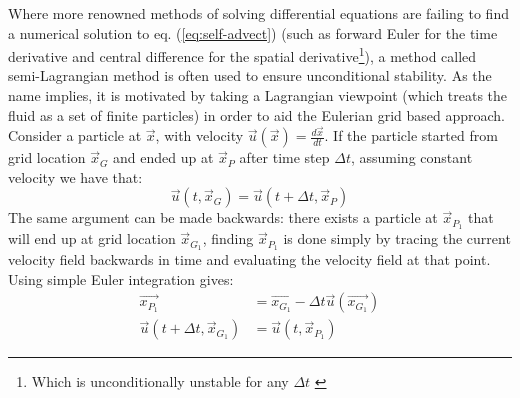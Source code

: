 \label{sec:self-advection-implementation}
Where more renowned methods of solving differential equations are failing to find a numerical solution to eq. (\ref{eq:self-advect}) (such as forward Euler for the time derivative and central difference for the spatial derivative\footnote{Which is unconditionally unstable for any \begin{math}\Delta t\end{math} \cite[p.~28]{bridson}}), a method called semi-Lagrangian method is often used to ensure unconditional stability. As the name implies, it is motivated by taking a Lagrangian viewpoint (which treats the fluid as a set of finite particles) in order to aid the Eulerian grid based approach. Consider a particle at  \begin{math}\vec{x}\end{math}, with velocity \begin{math}\vec{u}(\vec{x}) = \frac{d\vec{x}}{dt}\end{math}. If the particle started from grid location \begin{math}\vec{x}_G\end{math} and ended up at \begin{math}\vec{x}_P\end{math} after time step \begin{math}\Delta t \end{math}, assuming constant velocity we have that: 
\begin{equation}
\vec{u}(t,\vec{x}_G) = \vec{u}(t+\Delta t,\vec{x}_P)  
\end{equation}
The same argument can be made backwards: there exists a particle at \begin{math}\vec{x}_{P_1} \end{math} that will end up at grid location \begin{math}\vec{x}_{G_1}\end{math}, finding \begin{math}\vec{x}_{P_1}\end{math} is done simply by tracing the current velocity field backwards in time and evaluating the velocity field at that point. Using simple Euler integration gives: 
	\begin{align}
					      \label{eq:lagrangian}\vec{x_{P_1}}  & =    \vec{x_{G_1}} -  \Delta t \vec{u}(\vec{x_{G_1}})  \\ 
		\vec{u}(t + \Delta t,\vec{x}_{G_1}) &  =    \vec{u}(t,\vec{x}_{P_1}) 
	\end{align}
